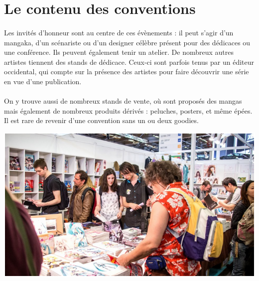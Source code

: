 \section{Le contenu des conventions}
\paragraph{}
Les invités d’honneur sont au centre de ces évènements : il peut s’agir d’un mangaka, d’un scénariste ou d’un designer célèbre présent pour des dédicaces ou une conférence. Ils peuvent également tenir un atelier. De nombreux autres artistes tiennent des stands de dédicace. Ceux-ci sont parfois tenus par un éditeur occidental, qui compte sur la présence des artistes pour faire découvrir une série en vue d’une publication.
\paragraph{}
On y trouve aussi de nombreux stands de vente, où sont proposés des mangas mais également de nombreux produits dérivés : peluches, posters, et même épées. Il est rare de revenir d’une convention sans un ou deux goodies.
\begin{center}
\includegraphics[scale=0.5]{boutique.png}
\end{center}
